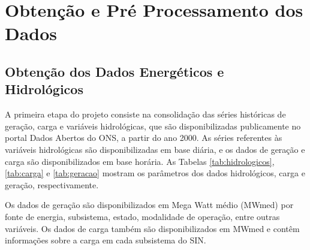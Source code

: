 \section{Obtenção e Pré Processamento dos Dados} %
\subsection{Obtenção dos Dados Energéticos e Hidrológicos} %

A primeira etapa do projeto consiste na consolidação das séries históricas de geração, carga e variáveis hidrológicas,
que são disponibilizadas publicamente no portal Dados Abertos do ONS, a partir do ano 2000. As séries referentes 
às variáveis hidrológicas são disponibilizadas em base diária, e os dados de geração e carga são disponibilizados em 
base horária. As Tabelas \ref{tab:hidrologicos}, \ref{tab:carga} e \ref{tab:geracao} mostram os parâmetros dos dados hidrológicos, 
carga e geração, respectivamente.

Os dados de geração são disponibilizados em Mega Watt médio (MWmed) por fonte de energia, subsistema, estado, 
modalidade de operação, entre outras variáveis. Os dados de carga também são disponibilizados em MWmed e contêm 
informações sobre a carga em cada subsistema do SIN.

